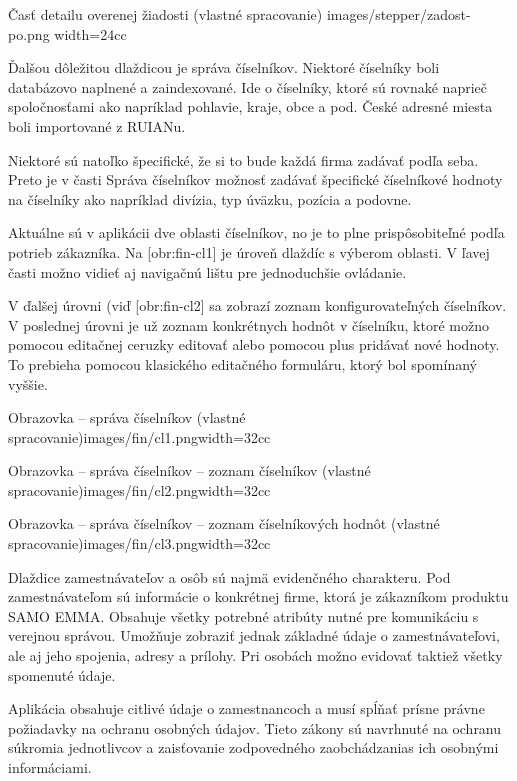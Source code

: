 {Časť detailu overenej žiadosti (vlastné spracovanie)}
{images/stepper/zadost-po.png}
{width=24cc}  



Ďalšou dôležitou dlaždicou je správa číselníkov. Niektoré číselníky boli databázovo naplnené a zaindexované. Ide o číselníky, ktoré sú rovnaké naprieč spoločnosťami ako napríklad pohlavie, kraje, obce a pod. České adresné miesta boli importované z RUIANu.

Niektoré sú natoľko špecifické, že si to bude každá firma zadávať podľa seba. Preto je v časti Správa číselníkov možnosť zadávať špecifické číselníkové hodnoty na číselníky ako napríklad divízia, typ úväzku, pozícia a podovne.

Aktuálne sú v aplikácii dve oblasti číselníkov, no je to plne prispôsobiteľné podľa potrieb zákazníka. Na [obr:fin-cl1] je úroveň dlaždíc s výberom oblasti. V ľavej časti možno vidieť aj navigačnú lištu pre jednoduchšie ovládanie. 

V ďalšej úrovni (viď [obr:fin-cl2] sa zobrazí zoznam konfigurovateľných číselníkov. V poslednej úrovni je už zoznam konkrétnych hodnôt v číselníku, ktoré možno pomocou editačnej ceruzky editovať alebo pomocou plus pridávať nové hodnoty. To prebieha pomocou klasického editačného formuláru, ktorý bol spomínaný vyššie.

{Obrazovka -- správa číselníkov (vlastné spracovanie)}{images/fin/cl1.png}{width=32cc} 

{Obrazovka -- správa číselníkov -- zoznam číselníkov (vlastné spracovanie)}{images/fin/cl2.png}{width=32cc} 

{Obrazovka -- správa číselníkov -- zoznam číselníkových hodnôt (vlastné spracovanie)}{images/fin/cl3.png}{width=32cc} 



Dlaždice zamestnávateľov a osôb sú najmä evidenčného charakteru. Pod zamestnávateľom sú informácie o konkrétnej firme, ktorá je zákazníkom produktu SAMO EMMA. Obsahuje všetky potrebné atribúty nutné pre komunikáciu s verejnou správou. Umožňuje zobraziť jednak základné údaje o zamestnávateľovi, ale aj jeho spojenia, adresy a prílohy. Pri osobách možno evidovať taktiež všetky spomenuté údaje.



Aplikácia obsahuje citlivé údaje o zamestnancoch a musí spĺňať prísne práv\-ne požiadavky na ochranu osobných údajov. Tieto zákony sú navrhnuté na ochranu súkromia jednotlivcov a zaisťovanie zodpovedného zaobchádzania\zlom s ich osobnými informáciami.


